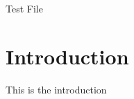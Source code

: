 \documentclass{article}
\begin{document}
	Test File
	
	\section{Introduction}
	
	This is the introduction
	
\end{document}
